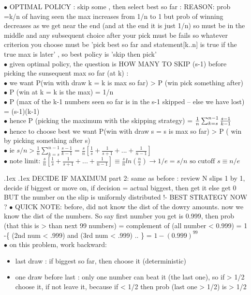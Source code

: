 \documentclass[10pt,landscape,a4paper]{article}
\makeatletter
\renewcommand{\section}{\@startsection{section}{1}{0mm}%
                                {.1ex}%
                                {.1ex}%
                                {\color{blue}\sffamily\small\bfseries}}
\makeatother
\begin{document}
\begin{multicols*}{3}
\begin{spacing}{0.1}
$\bullet$ OPTIMAL POLICY : skip some , then select best so far : REASON: prob =k/n of having seen the max increases from 1/n to 1 but prob of winning decreases as we get near the end (and at the end it is just 1/n) so must be in the middle and any subsequent choice after your pick must be fails so whatever criterion you choose must be 'pick best so far and statement[k..n] is true if the true max is later' , so best policy is 'skip then pick' \\
$\bullet$ given optimal policy, the question is HOW MANY TO SKIP (s-1) before picking the sunsequent max so far (at k) : \\
$\bullet$ we want P(win with draw k = k is max so far) > P (win pick something after) \\
$\bullet$ P (win at k = k is the max) = 1/n \\
$\bullet$ P (max of the k-1 numbers seen so far is in the s-1 skipped -- else we have lost) = (s-1)(k-1) \\
$\bullet$ hence P (picking the maximum with the skipping strategy) = $ \\ \frac{1}{n}\sum_{k=s}^{n-1} \frac{s-1}{k-1}  $ \\
$\bullet$ hence to choose best we want P(win with draw s = s is max so far) > P ( win by picking something after s) \\
$\bullet$ ie $s/n > \frac{1}{n}\sum_{k=s}^{n-1} \frac{s-1}{k-1} = \frac{s}{n} \left[ \frac{1}{s} + \frac{1}{s+1} + ... + \frac{1}{n-1} \right] $ \\
$\bullet$ note limit: $ \frac{s}{n} \left[ \frac{1}{s} + \frac{1}{s+1} + ... + \frac{1}{n-1} \right] \equiv \frac{s}{n} ln (\frac{n}{s}) \rightarrow 1/e = s/n \text{ so cutoff } s \equiv n/e$

\section{DECIDE IF MAXIMUM part 2: same as before : review N slips 1 by 1, decide if biggest or move on, if decision = actual biggest, then get it else get 0 BUT the number on the slip is uniformly distributed !- BEST STRATEGY NOW ?}
$\bullet$ QUICK NOTE: before, did not know the dist of the dowry amounts. now we know the dist of the numbers. So say first number you get is 0.999, then prob (that this is > than next 99 numbers) = complement of (all number < 0.999) = 1 -\{ (2nd num < .999) and (3rd num < .999) .. \} = $1-(0.999)^{99}$ \\
$\bullet$ on this problem, work backward:
\begin{itemize}[leftmargin=0.5cm]
\item last draw : if biggest so far, then choose it (deterministic)
\item one draw before last : only one number can beat it (the last one), so if > 1/2 choose it, if not leave it, because if < 1/2 then prob (last one > 1/2) is > 1/2


\end{itemize}
\end{spacing}
\end{multicols*}
\end{document}
